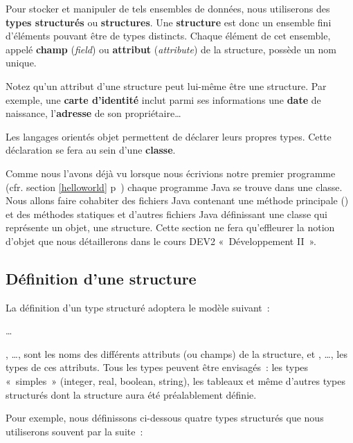 Pour stocker et manipuler de tels ensembles de données, nous utiliserons des
\textbf{types structurés} ou \textbf{structures}.  Une \textbf{structure} est
donc un ensemble fini d’éléments pouvant être de types distincts.  Chaque
élément de cet ensemble, appelé \textbf{champ} (\textit{field}) ou
\textbf{attribut} (\textit{attribute}) de la structure, possède un nom unique.
		
Notez qu’un attribut d’une structure peut lui-même être une structure.  Par
exemple, une \textbf{carte d’identité} inclut parmi ses informations une
\textbf{date} de naissance, l’\textbf{adresse} de son propriétaire\dots
	
Les langages orientés objet permettent de déclarer leurs propres types. Cette
déclaration se fera au sein d'une \textbf{classe}. 

Comme nous l'avons déjà vu lorsque nous écrivions notre premier programme (cfr.
section \ref{helloworld} p~\pageref{helloworld}) chaque programme Java se trouve
dans une classe. Nous allons faire cohabiter des fichiers Java contenant une
méthode principale () et des méthodes statiques et d'autres fichiers
Java définissant une classe qui représente un objet, une structure. Cette section
ne fera qu'effleurer la notion d'objet que nous détaillerons dans le cours DEV2 
«~Développement II~». 

	\subsection{Définition d’une structure}
	
		La définition d’un type structuré adoptera le modèle suivant~:
	
		\begin{pseudocode}
			\Stmt \dots
		\EndStruct
		\end{pseudocode}
	
		, \dots,  sont les noms des
		différents attributs (ou champs) de la structure, et , \dots,
		 les types de ces attributs.  Tous les types peuvent être
		envisagés~: les types «~simples~» (integer, real, boolean, string), les
		tableaux et même d’autres types structurés dont la structure aura été
		préalablement définie.
	
		Pour exemple, nous définissons ci-dessous quatre
		types structurés que nous utiliserons souvent par la suite~:
	
